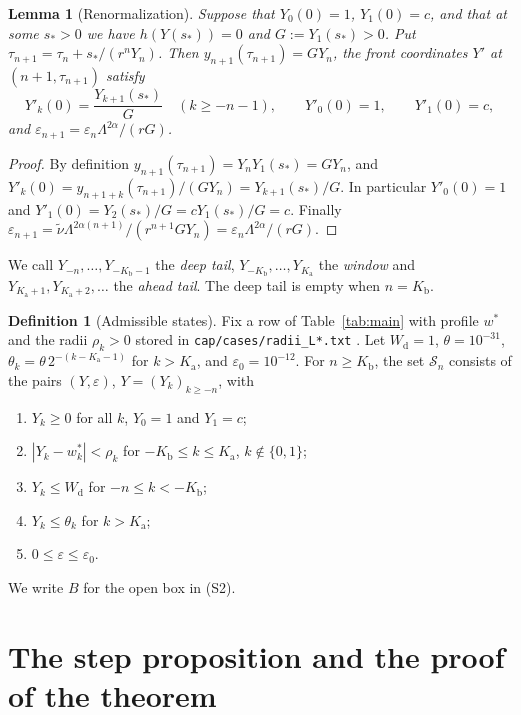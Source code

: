 \documentclass[12pt,reqno]{amsart}
\numberwithin{equation}{section}
\theoremstyle{plain}
\newtheorem{lemma}[theorem]{Lemma}
\theoremstyle{definition}
\newtheorem{definition}[theorem]{Definition}
\theoremstyle{remark}
\newcommand{\Kb}{K_{\mathrm b}}
\newcommand{\Ka}{K_{\mathrm a}}
\newcommand{\Wd}{W_{\mathrm d}}
\newcommand{\eps}{\varepsilon}
\begin{document}
\begin{lemma}[Renormalization]\label{lem:renorm}
Suppose that $Y_0(0)=1$, $Y_1(0)=c$, and that at some $s_*>0$ we have
$h(Y(s_*))=0$ and $G:=Y_1(s_*)>0$. Put $\tau_{n+1}=\tau_n+s_*/(r^nY_n)$. Then
$y_{n+1}(\tau_{n+1})=GY_n$, the front coordinates $Y'$ at $(n+1,\tau_{n+1})$ satisfy
\[
  Y'_k(0)=\frac{Y_{k+1}(s_*)}{G}\quad(k\ge-n-1),\qquad Y'_0(0)=1,\qquad Y'_1(0)=c,
\]
and $\eps_{n+1}=\eps_n\Lambda^{2\alpha}/(rG)$.
\end{lemma}

\begin{proof}
By definition $y_{n+1}(\tau_{n+1})=Y_nY_1(s_*)=GY_n$, and
$Y'_k(0)=y_{n+1+k}(\tau_{n+1})/(GY_n)=Y_{k+1}(s_*)/G$. In particular
$Y'_0(0)=1$ and $Y'_1(0)=Y_2(s_*)/G=cY_1(s_*)/G=c$. Finally
$\eps_{n+1}=\tilde\nu\Lambda^{2\alpha(n+1)}/(r^{n+1}GY_n)=\eps_n\Lambda^{2\alpha}/(rG)$.
\end{proof}

We call $Y_{-n},\dots,Y_{-\Kb-1}$ the \emph{deep tail}, $Y_{-\Kb},\dots,Y_{\Ka}$ the
\emph{window} and $Y_{\Ka+1},Y_{\Ka+2},\dots$ the \emph{ahead tail}. The deep tail is
empty when $n=\Kb$.

\begin{definition}[Admissible states]\label{def:S}
Fix a row of Table~\ref{tab:main} with profile $w^*$ and the radii
$\rho_k>0$ stored in \texttt{cap/cases/radii\_L*.txt} \cite{Data}. Let
$\Wd=1$, $\theta=10^{-31}$, $\theta_k=\theta\,2^{-(k-\Ka-1)}$ for $k>\Ka$, and
$\eps_0=10^{-12}$. For $n\ge\Kb$, the set $\mathcal S_n$ consists of the pairs
$(Y,\eps)$, $Y=(Y_k)_{k\ge-n}$, with
\begin{enumerate}[label=\textup{(S\arabic*)}]
\item $Y_k\ge0$ for all $k$, $Y_0=1$ and $Y_1=c$;
\item $|Y_k-w^*_k|<\rho_k$ for $-\Kb\le k\le\Ka$, $k\notin\{0,1\}$;
\item $Y_k\le\Wd$ for $-n\le k<-\Kb$;
\item $Y_k\le\theta_k$ for $k>\Ka$;
\item $0\le\eps\le\eps_0$.
\end{enumerate}
We write $B$ for the open box in (S2).
\end{definition}

\section{The step proposition and the proof of the theorem}\label{sec:proof}
\end{document}
